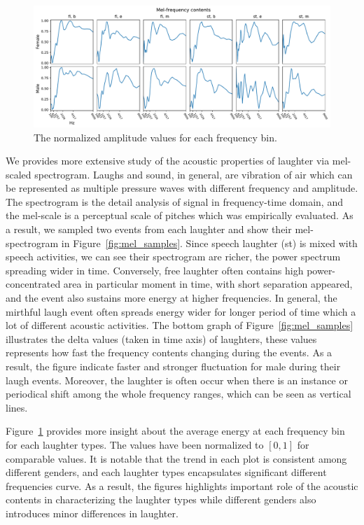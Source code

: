 \documentclass[10pt,journal,compsoc]{IEEEtran}
\begin{document}
\begin{figure}[!t]
\centering
\includegraphics[width=1\linewidth]{figures/mel_contents.pdf}
\caption{The normalized amplitude values for each frequency bin.}
\label{fig:mel_contents}
\end{figure}
We provides more extensive study of the acoustic properties of laughter via mel-scaled spectrogram. Laughs and sound, in general, are vibration of air which can be represented as multiple pressure waves with different frequency and amplitude. The spectrogram is the detail analysis of signal in frequency-time domain, and the mel-scale \cite{melscale} is a perceptual scale of pitches which was empirically evaluated. As a result, we sampled two events from each laughter and show their mel-spectrogram in Figure~\ref{fig:mel_samples}.
Since speech laughter (st) is mixed with speech activities, we can see their spectrogram are richer, the power spectrum spreading wider in time. Conversely, free laughter often contains high power-concentrated area in particular moment in time, with short separation appeared, and the event also sustains more energy at higher frequencies.
In general, the mirthful laugh event often spreads energy wider for longer period of time which a lot of different acoustic activities.
The bottom graph of Figure~\ref{fig:mel_samples} illustrates the delta values (taken in time axis) of laughters, these values represents how fast the frequency contents changing during the events. As a result, the figure indicate faster and stronger fluctuation for male during their laugh events. Moreover, the laughter is often occur when there is an instance or periodical shift among the whole frequency ranges, which can be seen as vertical lines.

Figure~\ref{fig:mel_contents} provides more insight about the average energy at each frequency bin for each laughter types. The values have been normalized to $[0, 1]$ for comparable values. It is notable that the trend in each plot is consistent among different genders, and each laughter types encapsulates significant different frequencies curve. As a result, the figures highlights important role of the acoustic contents in characterizing the laughter types while different genders also introduces minor differences in laughter.
\end{document}
